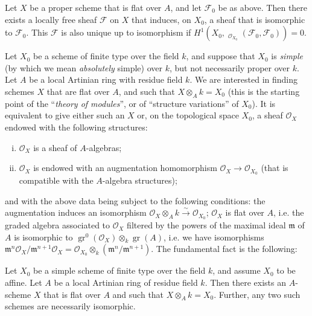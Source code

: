 \documentclass{article}
\theoremstyle{plain}
\newenvironment{theorem}[1]
  {\renewcommand\theinnercustomtheorem{#1}\innercustomtheorem}
  {\endinnercustomtheorem}
\newenvironment{corollary}[1]
  {\renewcommand\theinnercustomcorollary{#1}\innercustomcorollary}
  {\endinnercustomcorollary}
\theoremstyle{definition}
\newcommand{\sh}{\mathscr}
\newcommand{\fk}{\mathfrak}
\DeclareMathOperator{\Hom}{Hom}
\DeclareMathOperator{\shHom}{\underline{\Hom}}
\DeclareMathOperator{\gr}{gr}
\newcommand{\oldpage}[1]{\marginpar{\footnotesize$\Big\vert$ \textit{p.~#1}}}
\begin{document}
\begin{corollary}{1}
\label{proposition3corollary1}
  Let $X$ be a proper scheme that is flat over $A$, and let $\sh{F}_0$ be as above.
  Then there exists a locally free sheaf $\sh{F}$ on $X$ that induces, on $X_0$, a sheaf that is isomorphic to $\sh{F}_0$.
  This $\sh{F}$ is also unique up to isomorphism if $H^1(X_0,\shHom_{\sh{O}_{X_0}}(\sh{F}_0,\sh{F}_0))=0$.
\end{corollary}

Let $X_0$ be a scheme of finite type over the field $k$, and suppose that $X_0$ is \emph{simple} (by which we mean \emph{absolutely} simple) over $k$, but not necessarily proper over $k$.
Let $A$ be a local Artinian ring with residue field $k$.
We are interested in finding schemes $X$ that are flat over $A$, and such that $X\otimes_A k=X_0$ (this is the starting point of the ``\emph{theory of modules}'', or of ``structure variations''
\oldpage{182-12}
of $X_0$).
It is equivalent to give either such an $X$ or, on the topological space $X_0$, a sheaf $\sh{O}_X$ endowed with the following structures:
\begin{enumerate}[i.]
  \item $\sh{O}_X$ is a sheaf of $A$-algebras;
  \item $\sh{O}_X$ is endowed with an augmentation homomorphism $\sh{O}_X\to\sh{O}_{X_0}$ (that is compatible with the $A$-algebra structures);
\end{enumerate}
and with the above data being subject to the following conditions: the augmentation induces an isomorphism $\sh{O}_X\otimes_A k\xrightarrow{\sim}\sh{O}_{X_0}$;
$\sh{O}_X$ is flat over $A$, i.e. the graded algebra associated to $\sh{O}_X$ filtered by the powers of the maximal ideal $\fk{m}$ of $A$ is isomorphic to $\gr^0(\sh{O}_X)\otimes_k\gr(A)$, i.e. we have isomorphisms $\fk{m}^n\sh{O}_X/\fk{m}^{n+1}\sh{O}_X = \sh{O}_{X_0}\otimes_k(\fk{m}^n/\fk{m}^{n+1})$.
The fundamental fact is the following:

\begin{theorem}{8}
\label{theorem8}
  Let $X_0$ be a simple scheme of finite type over the field $k$, and assume $X_0$ to be affine.
  Let $A$ be a local Artinian ring of residue field $k$.
  Then there exists an $A$-scheme $X$ that is flat over $A$ and such that $X\otimes_A k=X_0$.
  Further, any two such schemes are necessarily isomorphic.
\end{theorem}
\end{document}
